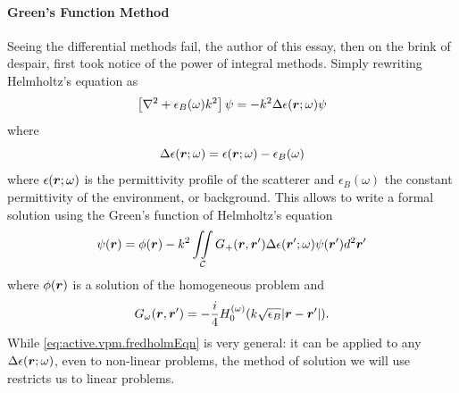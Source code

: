 %
%

\paragraph{Green's Function Method}
Seeing the differential methods fail, the author of this essay, 
then on the brink of despair, first took notice of the 
power of integral methods. Simply rewriting Helmholtz's 
equation as
  \begin{equation}
   \left[\nabla^2+\epsilon_B(\omega)k^2\right]\psi=-k^2\Delta\epsilon(\boldsymbol{r};\omega)\psi
  \end{equation}
where 
  \begin{equation}
  \Delta\epsilon(\boldsymbol{r};\omega)=\epsilon(\boldsymbol{r};\omega)-\epsilon_B(\omega)
  \end{equation}
where $\epsilon(\boldsymbol{r};\omega)$ is the permittivity profile of the scatterer
and $\epsilon_B(\omega)$ the constant permittivity of the environment, or background.
This allows to write a formal solution using the Green's function of Helmholtz's equation
  \begin{equation}
  	\label{eq:active.vpm.fredholmEqn}
  	\psi(\boldsymbol{r}) = \phi(\boldsymbol{r}) - k^2\mathop{\iint}_\mathcal{C}G_{+}(\boldsymbol{r},\boldsymbol{r}')\Delta\epsilon(\boldsymbol{r}';\omega)\psi(\boldsymbol{r}')d^2\boldsymbol{r}'
  \end{equation}
where $\phi(\boldsymbol{r})$ is a solution of the homogeneous problem and
  \begin{equation}
  	G_\omega(\boldsymbol{r},\boldsymbol{r}') = -\frac{i}{4}H_0^{(\omega)}(k\sqrt{\epsilon_B}|\boldsymbol{r}-\boldsymbol{r}'|).
  \end{equation}
While \eqref{eq:active.vpm.fredholmEqn} is very general: it can be applied to 
any $\Delta\epsilon(\boldsymbol{r};\omega)$, even to non-linear problems, 
the method of solution we will use restricts us to linear problems.

